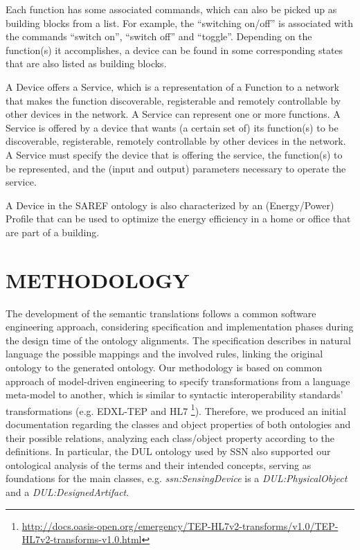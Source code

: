 \documentclass{sig-alternate-05-2015}
\begin{document}
Each function has some associated commands, which can also be picked up as building blocks from a list. For example, the “switching on/off” is associated with the commands “switch on”, “switch off” and “toggle”. Depending on the function(s) it accomplishes, a device can be found in some corresponding states that are also listed as building blocks. 

A Device offers a Service, which  is a representation of a Function to a network that makes the function discoverable, registerable and remotely controllable by other devices in the network. A Service can represent one or more functions. A Service is offered by a device that wants (a certain set of) its function(s) to be discoverable, registerable, remotely controllable by other devices in the network. A Service must specify the device that is offering the service, the function(s) to be represented, and the (input and output) parameters necessary to operate the service. 

A Device in the SAREF ontology is also characterized by an (Energy/Power) Profile that can be used to optimize the energy efficiency in a home or office that are part of a building.

\section{METHODOLOGY}
The development of the semantic translations follows a common software engineering approach, considering specification and implementation phases during the design time of the ontology alignments. The specification describes in natural language the possible mappings and the involved rules, linking the original ontology to the generated ontology. Our methodology is based on common approach of model-driven engineering to specify transformations from a language meta-model to another, which is similar to syntactic interoperability standards' transformations (e.g. EDXL-TEP and HL7 \footnote{\url{http://docs.oasis-open.org/emergency/TEP-HL7v2-transforms/v1.0/TEP-HL7v2-transforms-v1.0.html}}). Therefore, we produced an initial documentation regarding the classes and object properties of both ontologies and their possible relations, analyzing each class/object property according to the definitions. In particular, the DUL ontology used by SSN also supported our ontological analysis of the terms and their intended concepts, serving as foundations for the main classes, e.g. \textit{ssn:SensingDevice} is a \textit{DUL:PhysicalObject} and a \textit{DUL:DesignedArtifact}.
\end{document}
